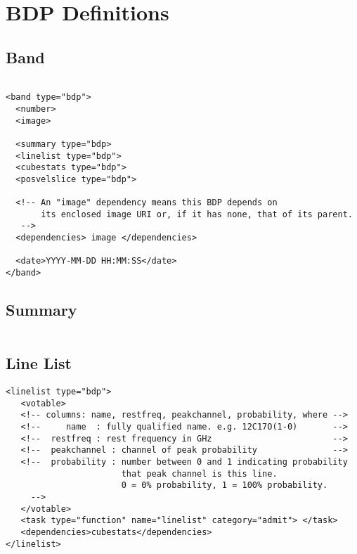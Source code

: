 \documentclass{article}
\begin{document}
\appendix
\section{BDP Definitions}

\subsection{Band}
\footnotesize
\begin{verbatim}

<band type="bdp">
  <number>
  <image>

  <summary type="bdp>
  <linelist type="bdp">
  <cubestats type="bdp">
  <posvelslice type="bdp">

  <!-- An "image" dependency means this BDP depends on 
       its enclosed image URI or, if it has none, that of its parent.
   -->
  <dependencies> image </dependencies>

  <date>YYYY-MM-DD HH:MM:SS</date>
</band>

\end{verbatim}

\subsection{Summary}
\footnotesize
\begin{verbatim}
\end{verbatim}

\subsection{Line List}
\footnotesize
\begin{verbatim}
<linelist type="bdp">
   <votable>
   <!-- columns: name, restfreq, peakchannel, probability, where -->
   <!--     name  : fully qualified name. e.g. 12C17O(1-0)       -->
   <!--  restfreq : rest frequency in GHz                        -->
   <!--  peakchannel : channel of peak probability               -->
   <!--  probability : number between 0 and 1 indicating probability
                       that peak channel is this line. 
                       0 = 0% probability, 1 = 100% probability.
     -->
   </votable>
   <task type="function" name="linelist" category="admit"> </task>
   <dependencies>cubestats</dependencies>
</linelist>

\end{verbatim}
\end{document}
